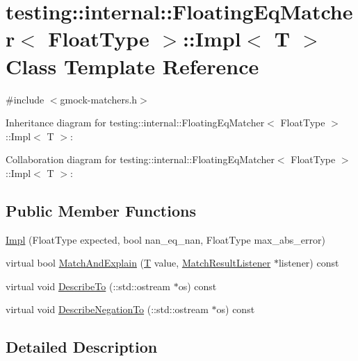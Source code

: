 \hypertarget{classtesting_1_1internal_1_1_floating_eq_matcher_1_1_impl}{}\section{testing\+:\+:internal\+:\+:Floating\+Eq\+Matcher$<$ Float\+Type $>$\+:\+:Impl$<$ T $>$ Class Template Reference}
\label{classtesting_1_1internal_1_1_floating_eq_matcher_1_1_impl}


{\ttfamily \#include $<$gmock-\/matchers.\+h$>$}



Inheritance diagram for testing\+:\+:internal\+:\+:Floating\+Eq\+Matcher$<$ Float\+Type $>$\+:\+:Impl$<$ T $>$\+:


Collaboration diagram for testing\+:\+:internal\+:\+:Floating\+Eq\+Matcher$<$ Float\+Type $>$\+:\+:Impl$<$ T $>$\+:
\subsection*{Public Member Functions}
\begin{DoxyCompactItemize}
\item 
\hyperlink{classtesting_1_1internal_1_1_floating_eq_matcher_1_1_impl_a314057e171f872ad478b3e143121aecd}{Impl} (Float\+Type expected, bool nan\+\_\+eq\+\_\+nan, Float\+Type max\+\_\+abs\+\_\+error)
\item 
virtual bool \hyperlink{classtesting_1_1internal_1_1_floating_eq_matcher_1_1_impl_af44c07dae0a5ccf6d9d7cfef077ad678}{Match\+And\+Explain} (\hyperlink{functions__7_8js_adf1f3edb9115acb0a1e04209b7a9937b}{T} value, \hyperlink{classtesting_1_1_match_result_listener}{Match\+Result\+Listener} $\ast$listener) const 
\item 
virtual void \hyperlink{classtesting_1_1internal_1_1_floating_eq_matcher_1_1_impl_a9cbacc70992f4776a9785716546f13a2}{Describe\+To} (\+::std\+::ostream $\ast$os) const 
\item 
virtual void \hyperlink{classtesting_1_1internal_1_1_floating_eq_matcher_1_1_impl_ab8799175394f311082142850717dabd0}{Describe\+Negation\+To} (\+::std\+::ostream $\ast$os) const 
\end{DoxyCompactItemize}


\subsection{Detailed Description}

